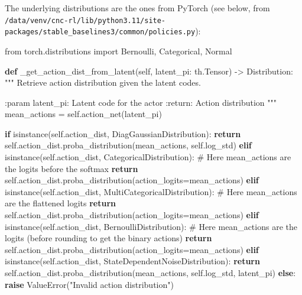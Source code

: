 \documentclass[
  letterpaper,
  DIV=11,
  numbers=noendperiod]{scrartcl}
\newenvironment{Shaded}{\begin{snugshade}}{\end{snugshade}}
\newcommand{\BuiltInTok}[1]{\textcolor[rgb]{0.00,0.23,0.31}{#1}}
\newcommand{\CommentTok}[1]{\textcolor[rgb]{0.37,0.37,0.37}{#1}}
\newcommand{\ControlFlowTok}[1]{\textcolor[rgb]{0.00,0.23,0.31}{\textbf{#1}}}
\newcommand{\ImportTok}[1]{\textcolor[rgb]{0.00,0.46,0.62}{#1}}
\newcommand{\KeywordTok}[1]{\textcolor[rgb]{0.00,0.23,0.31}{\textbf{#1}}}
\newcommand{\NormalTok}[1]{\textcolor[rgb]{0.00,0.23,0.31}{#1}}
\newcommand{\OperatorTok}[1]{\textcolor[rgb]{0.37,0.37,0.37}{#1}}
\newcommand{\PreprocessorTok}[1]{\textcolor[rgb]{0.68,0.00,0.00}{#1}}
\newcommand{\StringTok}[1]{\textcolor[rgb]{0.13,0.47,0.30}{#1}}
\newcommand{\VariableTok}[1]{\textcolor[rgb]{0.07,0.07,0.07}{#1}}
\begin{document}
The underlying distributions are the ones from PyTorch (see below, from
\texttt{/data/venv/cnc-rl/lib/python3.11/site-packages/stable\_baselines3/common/policies.py}):

\begin{Shaded}
\begin{Highlighting}[]
\ImportTok{from}\NormalTok{ torch.distributions }\ImportTok{import}\NormalTok{ Bernoulli, Categorical, Normal}
\end{Highlighting}
\end{Shaded}

\begin{Shaded}
\begin{Highlighting}[]
  \KeywordTok{def}\NormalTok{ \_get\_action\_dist\_from\_latent(}\VariableTok{self}\NormalTok{, latent\_pi: th.Tensor) }\OperatorTok{{-}\textgreater{}}\NormalTok{ Distribution:}
      \CommentTok{"""}
\CommentTok{      Retrieve action distribution given the latent codes.}

\CommentTok{      :param latent\_pi: Latent code for the actor}
\CommentTok{      :return: Action distribution}
\CommentTok{      """}
\NormalTok{      mean\_actions }\OperatorTok{=} \VariableTok{self}\NormalTok{.action\_net(latent\_pi)}

      \ControlFlowTok{if} \BuiltInTok{isinstance}\NormalTok{(}\VariableTok{self}\NormalTok{.action\_dist, DiagGaussianDistribution):}
          \ControlFlowTok{return} \VariableTok{self}\NormalTok{.action\_dist.proba\_distribution(mean\_actions, }\VariableTok{self}\NormalTok{.log\_std)}
      \ControlFlowTok{elif} \BuiltInTok{isinstance}\NormalTok{(}\VariableTok{self}\NormalTok{.action\_dist, CategoricalDistribution):}
          \CommentTok{\# Here mean\_actions are the logits before the softmax}
          \ControlFlowTok{return} \VariableTok{self}\NormalTok{.action\_dist.proba\_distribution(action\_logits}\OperatorTok{=}\NormalTok{mean\_actions)}
      \ControlFlowTok{elif} \BuiltInTok{isinstance}\NormalTok{(}\VariableTok{self}\NormalTok{.action\_dist, MultiCategoricalDistribution):}
          \CommentTok{\# Here mean\_actions are the flattened logits}
          \ControlFlowTok{return} \VariableTok{self}\NormalTok{.action\_dist.proba\_distribution(action\_logits}\OperatorTok{=}\NormalTok{mean\_actions)}
      \ControlFlowTok{elif} \BuiltInTok{isinstance}\NormalTok{(}\VariableTok{self}\NormalTok{.action\_dist, BernoulliDistribution):}
          \CommentTok{\# Here mean\_actions are the logits (before rounding to get the binary actions)}
          \ControlFlowTok{return} \VariableTok{self}\NormalTok{.action\_dist.proba\_distribution(action\_logits}\OperatorTok{=}\NormalTok{mean\_actions)}
      \ControlFlowTok{elif} \BuiltInTok{isinstance}\NormalTok{(}\VariableTok{self}\NormalTok{.action\_dist, StateDependentNoiseDistribution):}
          \ControlFlowTok{return} \VariableTok{self}\NormalTok{.action\_dist.proba\_distribution(mean\_actions, }\VariableTok{self}\NormalTok{.log\_std, latent\_pi)}
      \ControlFlowTok{else}\NormalTok{:}
          \ControlFlowTok{raise} \PreprocessorTok{ValueError}\NormalTok{(}\StringTok{"Invalid action distribution"}\NormalTok{)}
\end{Highlighting}
\end{Shaded}
\end{document}
